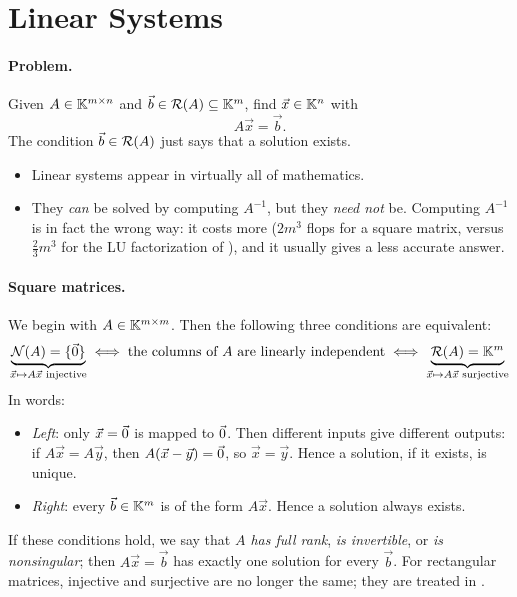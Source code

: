 \clearpage
\section{Linear Systems}

\paragraph{Problem.} Given $A \in \mathbb{K}^{m \times n}$ and $\vec{b} \in \mathcal{R}(A) \subseteq \mathbb{K}^m$, find $\vec{x} \in \mathbb{K}^n$ with
\begin{equation}
  A\vec{x} = \vec{b}.
\end{equation}
The condition $\vec{b} \in \mathcal{R}(A)$ just says that a solution exists.
\begin{itemize}
  \item Linear systems appear in virtually all of mathematics.
  \item They \emph{can} be solved by computing $A^{-1}$, but they \emph{need not} be. Computing $A^{-1}$ is in fact the wrong way: it costs more ($2m^3$ flops for a square matrix, versus $\tfrac{2}{3}m^3$ for the LU factorization of ), and it usually gives a less accurate answer.
\end{itemize}

\paragraph{Square matrices.} We begin with $A \in \mathbb{K}^{m \times m}$. Then the following three conditions are equivalent:
\begin{equation}
  \underbrace{\mathcal{N}(A) = \{\vec{0}\}}_{\vec{x} \mapsto A\vec{x} \text{ injective}}
  \iff \text{the columns of } A \text{ are linearly independent} \iff
  \underbrace{\mathcal{R}(A) = \mathbb{K}^m}_{\vec{x} \mapsto A\vec{x} \text{ surjective}}
\end{equation}
In words:
\begin{itemize}
  \item \emph{Left}: only $\vec{x} = \vec{0}$ is mapped to $\vec{0}$. Then different inputs give different outputs: if $A\vec{x} = A\vec{y}$, then $A(\vec{x} - \vec{y}) = \vec{0}$, so $\vec{x} = \vec{y}$. Hence a solution, if it exists, is unique.
  \item \emph{Right}: every $\vec{b} \in \mathbb{K}^m$ is of the form $A\vec{x}$. Hence a solution always exists.
\end{itemize}
If these conditions hold, we say that \emph{$A$ has full rank}, \emph{is invertible}, or \emph{is nonsingular}; then $A\vec{x} = \vec{b}$ has exactly one solution for every $\vec{b}$. For rectangular matrices, injective and surjective are no longer the same; they are treated in .

